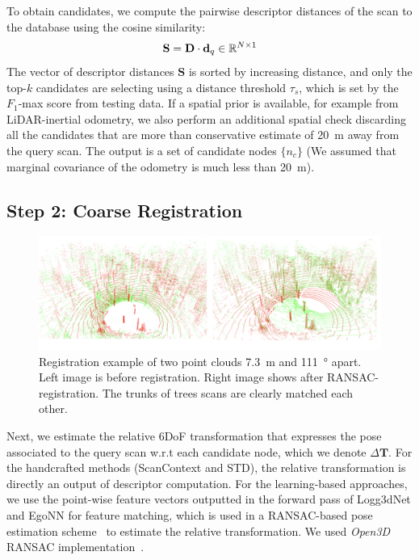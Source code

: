 To obtain candidates, we compute the pairwise descriptor distances of the scan to the database using the cosine similarity:
\begin{equation}
  \mathbf{S} = \mathbf{D} \cdot \mathbf{d}_{q} \in \mathbb{R}^{N \times 1}
\end{equation}
The vector of descriptor distances $\mathbf{S}$ is sorted by increasing distance, and only the top-$k$ candidates are selecting using a distance threshold $\tau_{s}$, which is set by the $F_1$-max score from testing data.
If a spatial prior is available, for example from LiDAR-inertial odometry, we also perform an additional spatial check discarding all the candidates that are more than conservative estimate of \SI{20}{\meter} away from the query scan. The output is a set of candidate nodes $\{ n_c\}$ (We assumed that marginal covariance of the odometry is much less than \SI{20}{\meter}).


\subsection*{\textbf{Step 2: Coarse Registration}}
\label{subsubsec:coarse-registration}
\begin{figure}[htbp]
  \centering
  \includegraphics*[width=\columnwidth]{pics/methods_registration.png}
  \caption{Registration example of two point clouds \SI{7.3}{\meter} and \SI{111}{\degree} apart. Left image is before registration. Right image shows after RANSAC-registration. The trunks of trees scans are clearly matched each other. }
  \label{fig:registration_example}
\end{figure}
Next, we estimate the relative 6DoF transformation that expresses the pose associated to the query scan w.r.t each candidate node, which we denote $\Delta \mathbf{T}$. For the handcrafted methods (ScanContext and STD), the relative transformation is directly an output of descriptor computation. For the learning-based approaches, we use the point-wise feature vectors outputted in the forward pass of Logg3dNet and EgoNN for feature matching, which is used in a RANSAC-based pose estimation scheme~\cite{fischler1981ransac} to estimate the relative transformation. We used \emph{Open3D} RANSAC implementation~\cite{zhou2018}.  

